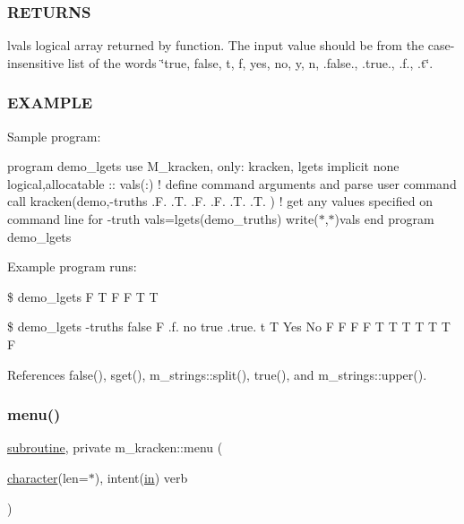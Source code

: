 \subsubsection*{R\+E\+T\+U\+R\+NS}

lvals logical array returned by function. The input value should be from the case-\/insensitive list of the words \char`\"{}true, false,
                t, f, yes, no, y, n, .\+false., .\+true., .\+f., .\+t\char`\"{}.

\subsubsection*{E\+X\+A\+M\+P\+LE}

Sample program\+:

program demo\+\_\+lgets use M\+\_\+kracken, only\+: kracken, lgets implicit none logical,allocatable \+:\+: vals(\+:) ! define command arguments and parse user command call kracken(\textquotesingle{}demo\textquotesingle{},\textquotesingle{}-\/truths .F. .T. .F. .F. .T. .T.\textquotesingle{} ) ! get any values specified on command line for -\/truth vals=lgets(\textquotesingle{}demo\+\_\+truths\textquotesingle{}) write($\ast$,$\ast$)vals end program demo\+\_\+lgets

Example program runs\+:

\$ demo\+\_\+lgets F T F F T T

\$ demo\+\_\+lgets -\/truths false F .f. no true .true. t T Yes No F F F F T T T T T T F 

References false(), sget(), m\+\_\+strings\+::split(), true(), and m\+\_\+strings\+::upper().

\mbox{\label{namespacem__kracken_ad0cfac1dcc02e0a67841f546cb57f823}} 
\subsubsection{\texorpdfstring{menu()}{menu()}}
{\footnotesize\ttfamily \hyperlink{M__stopwatch_83_8txt_acfbcff50169d691ff02d4a123ed70482}{subroutine}, private m\+\_\+kracken\+::menu (\begin{DoxyParamCaption}\item[{\hyperlink{option__stopwatch_83_8txt_abd4b21fbbd175834027b5224bfe97e66}{character}(len=$\ast$), intent(\hyperlink{M__journal_83_8txt_afce72651d1eed785a2132bee863b2f38}{in})}]{verb }\end{DoxyParamCaption})\hspace{0.3cm}{\ttfamily [private]}}



